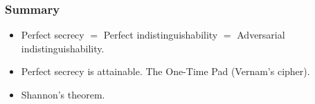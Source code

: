 \begin{frame}\frametitle{Summary}
\begin{itemize}
\item Perfect secrecy $=$ Perfect indistinguishability $=$ Adversarial indistinguishability.
\item Perfect secrecy is attainable. The One-Time Pad (Vernam's cipher).
\item Shannon's theorem.
\end{itemize}	
\end{frame}

